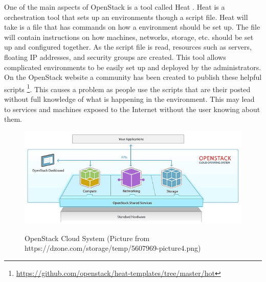 \documentclass[12pt]{article}
\begin{document}
One of the main aspects of OpenStack is a tool called Heat \cite{HeatOS}. Heat is a orchestration tool that sets up an environments though a script file. Heat will take is a file that has commands on how a environment should be set up. The file will contain instructions on how machines, networks, storage, etc. should be set up and configured together. As the script file is read, resources such as servers, floating IP addresses, and security groups are created. This tool allows complicated environments to be easily set up and deployed by the administrators. On the OpenStack website a community has been created to publish these helpful scripts \footnote{\href{https://github.com/openstack/heat-templates/tree/master/hot}{https://github.com/openstack/heat-templates/tree/master/hot}}. This causes a problem as people use the scripts that are their posted without full knowledge of what is happening in the environment. This may lead to services and machines exposed to the Internet without the user knowing about them.
\begin{figure}[H]
    \centering
    \includegraphics[scale=.7]{./pic/openstack-sm.png}
    \label{fig:OpenStack}
    \caption{OpenStack Cloud System (Picture from https://dzone.com/storage/temp/5607969-picture4.png)}
\end{figure}
\end{document}
